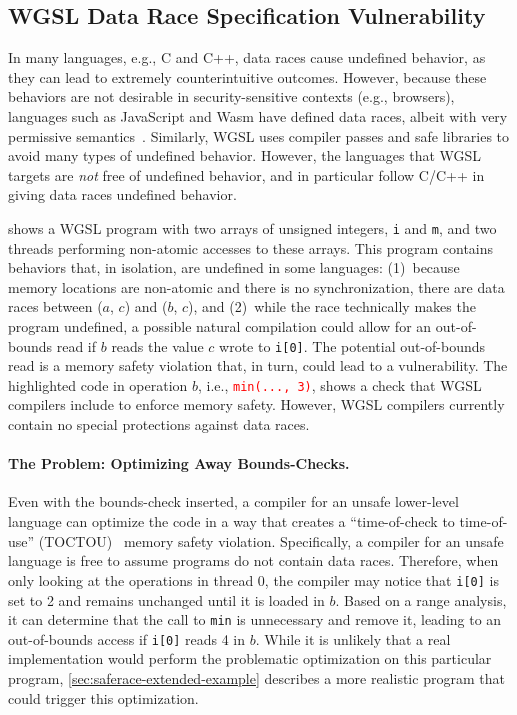 \subsection{WGSL Data Race Specification Vulnerability \label{sec:saferace-spec-vuln}}

In many languages, e.g., C and C++, data races cause undefined behavior, as they can lead to extremely counterintuitive outcomes. However, because these behaviors are not desirable in security-sensitive contexts (e.g., browsers), languages such as JavaScript and Wasm have defined data races, albeit with very permissive semantics~\cite{watt2019weakening,watt2020repairing}. Similarly, WGSL uses compiler passes and safe libraries to avoid many types of undefined behavior. However, the languages that WGSL targets are \textit{not} free of undefined behavior, and in particular follow C/C++ in giving data races undefined behavior.

\myfiglong{\ref{fig:saferace-oob-example-a}} shows a WGSL program with two arrays of unsigned integers, \texttt{i} and \texttt{m}, and two threads performing non-atomic accesses to these arrays. This program contains behaviors that, in isolation, are undefined in some languages: (1)~because memory locations are non-atomic and there is no synchronization, there are data races between ($a$, $c$) and ($b$, $c$), and (2)~while the race technically makes the program undefined, a possible natural compilation could allow for an out-of-bounds read if $b$ reads the value $c$ wrote to \texttt{i[0]}. The potential out-of-bounds read is a memory safety violation that, in turn, could lead to a vulnerability. The highlighted code in operation $b$, i.e., \textcolor{red}{\texttt{min(..., 3)}}, shows a check that WGSL compilers include to enforce memory safety. However, WGSL compilers currently contain no special protections against data races.

\paragraph{The Problem: Optimizing Away Bounds-Checks.} Even with the bounds-check inserted, a compiler for an unsafe lower-level language can optimize the code in a way that creates a ``time-of-check to time-of-use'' (TOCTOU)~\cite{abbott1976toctou} memory safety violation. Specifically, a compiler for an unsafe language is free to assume programs do not contain data races. Therefore, when only looking at the operations in thread 0, the compiler may notice that \texttt{i[0]} is set to 2 and remains unchanged until it is loaded in $b$. Based on a range analysis, it can determine that the call to \texttt{min} is unnecessary and remove it, leading to an out-of-bounds access if \texttt{i[0]} reads 4 in $b$. While it is unlikely that a real implementation would perform the problematic optimization on this particular program, \mysec\ref{sec:saferace-extended-example} describes a more realistic program that could trigger this optimization.

